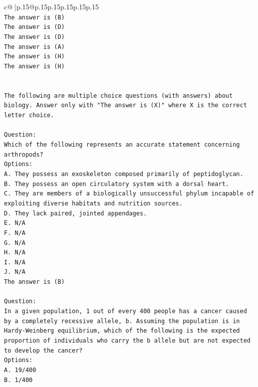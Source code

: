 \documentclass{article}
\begin{document}
{\begin{supertabular}{c@{$\;$}|p{.15\linewidth}@{}p{.15\linewidth}p{.15\linewidth}p{.15\linewidth}p{.15\linewidth}p{.15\linewidth}}
{{{\\ 
\texttt{The answer is (B)} \\
\texttt{The answer is (D)} \\
\texttt{The answer is (D)} \\
\texttt{The answer is (A)} \\
\texttt{The answer is (H)} \\
\texttt{The answer is (H)} \\
\\ 
\\ 
\texttt{The following are multiple choice questions (with answers) about biology. Answer only with "The answer is (X)" where X is the correct letter choice.} \\
\\ 
\texttt{Question:} \\
\texttt{Which of the following represents an accurate statement concerning arthropods?} \\
\texttt{Options:} \\
\texttt{A. They possess an exoskeleton composed primarily of peptidoglycan.} \\
\texttt{B. They possess an open circulatory system with a dorsal heart.} \\
\texttt{C. They are members of a biologically unsuccessful phylum incapable of exploiting diverse habitats and nutrition sources.} \\
\texttt{D. They lack paired, jointed appendages.} \\
\texttt{E. N/A} \\
\texttt{F. N/A} \\
\texttt{G. N/A} \\
\texttt{H. N/A} \\
\texttt{I. N/A} \\
\texttt{J. N/A} \\
\texttt{The answer is (B)} \\
\\ 
\texttt{Question:} \\
\texttt{In a given population, 1 out of every 400 people has a cancer caused by a completely recessive allele, b. Assuming the population is in Hardy{-}Weinberg equilibrium, which of the following is the expected proportion of individuals who carry the b allele but are not expected to develop the cancer?} \\
\texttt{Options:} \\
\texttt{A. 19/400} \\
\texttt{B. 1/400} \\
}}}
\end{supertabular}}
\end{document}
